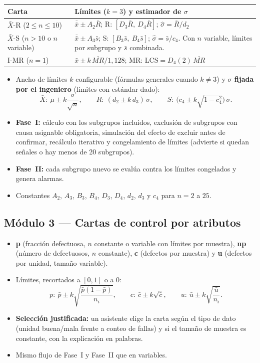 \documentclass[11pt,a4paper]{article}
\begin{document}
\begin{tabularx}{\linewidth}{@{}P{3cm}L@{}}
\toprule
\textbf{Carta} & \textbf{Límites ($k=3$) y estimador de $\sigma$}\\
\midrule
$\bar{X}$-R \newline ($2\le n\le 10$) & $\bar{\bar{x}} \pm A_2\bar{R}$; \quad R: $[D_3\bar{R},\ D_4\bar{R}]$; \quad $\hat\sigma=\bar{R}/d_2$\\
$\bar{X}$-S \newline ($n>10$ o $n$ variable) & $\bar{\bar{x}} \pm A_3\bar{s}$; \quad S: $[B_3\bar{s},\ B_4\bar{s}]$; \quad $\hat\sigma=\bar{s}/c_4$. Con $n$ variable, límites por subgrupo y $\bar{s}$ combinada.\\
I-MR ($n=1$) & $\bar{x} \pm k\,\overline{MR}/1{,}128$; \quad MR: $\text{LCS}=D_4(2)\,\overline{MR}$\\
\bottomrule
\end{tabularx}

\begin{itemize}
\item Ancho de límites $k$ configurable (fórmulas generales cuando $k\neq 3$) y \textbf{$\sigma$
  fijada por el ingeniero} (límites con estándar dado):
  \[
  \bar{X}:\ \mu \pm k\frac{\sigma}{\sqrt{n}},\qquad
  R:\ (d_2 \pm k\,d_3)\,\sigma,\qquad
  S:\ \bigl(c_4 \pm k\sqrt{1-c_4^2}\bigr)\,\sigma .
  \]
\item \textbf{Fase~I:} cálculo con los subgrupos incluidos, exclusión de subgrupos con causa
  asignable obligatoria, simulación del efecto de excluir antes de confirmar, recálculo
  iterativo y congelamiento de límites (advierte si quedan señales o hay menos de 20 subgrupos).
\item \textbf{Fase~II:} cada subgrupo nuevo se evalúa contra los límites congelados y genera
  alarmas.
\item Constantes $A_2$, $A_3$, $B_3$, $B_4$, $D_3$, $D_4$, $d_2$, $d_3$ y $c_4$ para $n=2$ a $25$.
\end{itemize}

\subsection{Módulo 3 — Cartas de control por atributos}
\begin{itemize}
\item \textbf{p} (fracción defectuosa, $n$ constante o variable con límites por muestra),
  \textbf{np} (número de defectuosos, $n$ constante), \textbf{c} (defectos por muestra) y
  \textbf{u} (defectos por unidad, tamaño variable).
\item Límites, recortados a $[0,1]$ o a $0$:
  \[
  p:\ \bar{p} \pm k\sqrt{\frac{\bar{p}(1-\bar{p})}{n_i}},\qquad
  c:\ \bar{c} \pm k\sqrt{\bar{c}},\qquad
  u:\ \bar{u} \pm k\sqrt{\frac{\bar{u}}{n_i}} .
  \]
\item \textbf{Selección justificada:} un asistente elige la carta según el tipo de dato (unidad
  buena/mala frente a conteo de fallas) y si el tamaño de muestra es constante, con la
  explicación en palabras.
\item Mismo flujo de Fase~I y Fase~II que en variables.
\end{itemize}
\end{document}
